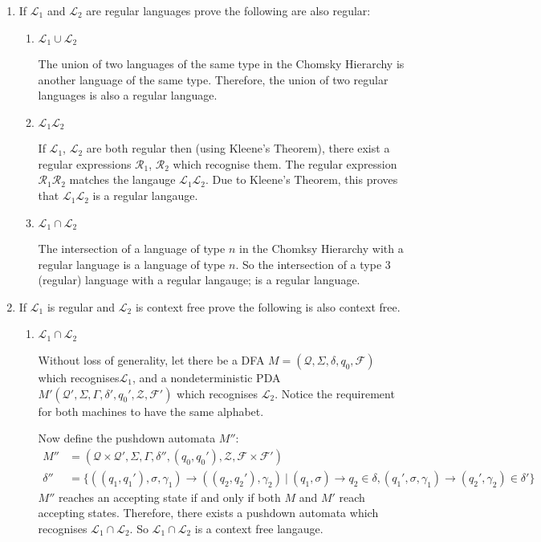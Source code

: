 \documentclass[10pt,\jkfside,a4paper]{article}
\begin{document}
\begin{enumerate}

\item If $\mathcal L_1$ and $\mathcal L_2$ are regular languages prove the
following are also regular:

\begin{enumerate}

\item $\mathcal L_1 \cup \mathcal L_2$

The union of two languages of the same type in the Chomsky Hierarchy is
another language of the same type. Therefore, the union of two regular
languages is also a regular language.

\item $\mathcal L_1 \mathcal L_2$

If $\mathcal L_1$, $\mathcal L_2$ are both regular then (using Kleene's
Theorem), there exist a regular expressions $\mathcal R_1$, $\mathcal R_2$
which recognise them. The regular expression $\mathcal R_1 \mathcal R_2$
matches the langauge $\mathcal L_1 \mathcal L_2$. Due to Kleene's Theorem,
this proves that $\mathcal L_1 \mathcal L_2$ is a regular langauge.

\item $\mathcal L_1 \cap \mathcal L_2$

The intersection of a language of type $n$ in the Chomksy Hierarchy with a
regular language is a language of type $n$. So the intersection of a type 3
(regular) language with a regular langauge; is a regular language.

\end{enumerate}

\item If $\mathcal L_1$ is regular and $\mathcal L_2$ is context free prove
the following is also context free.

\begin{enumerate}

\item $\mathcal L_1 \cap \mathcal L_2$

Without loss of generality, let there be a DFA $M = (\mathcal Q, \Sigma,
\delta, q_0, \mathcal F)$ which recognises$\mathcal L_1$, and a
nondeterministic PDA $M' (\mathcal Q', \Sigma, \Gamma, \delta', q_0',
\mathcal Z, \mathcal F')$ which recognises $\mathcal L_2$. Notice the
requirement for both machines to have the same alphabet.

Now define the pushdown automata $M''$:
\begin{align*}
M'' &= (\mathcal Q \times \mathcal Q', \Sigma, \Gamma, \delta'', (q_0, q_0'),
\mathcal Z, \mathcal F \times \mathcal
F')\\
\delta'' &= \{((q_1, q_1'), \sigma, \gamma_1) \to ((q_2, q_2'), \gamma_2)\ |
\ (q_1, \sigma) \to q_2 \in \delta, (q_1', \sigma, \gamma_1) \to (q_2',
\gamma_2) \in \delta'\}
\end{align*}
$M''$ reaches an accepting state if and only if both $M$ and $M'$ reach
accepting states. Therefore, there exists a pushdown automata which
recognises $\mathcal L_1 \cap \mathcal L_2$. So $\mathcal L_1 \cap \mathcal
L_2$ is a context free langauge.


\end{enumerate}
\end{enumerate}
\end{document}
